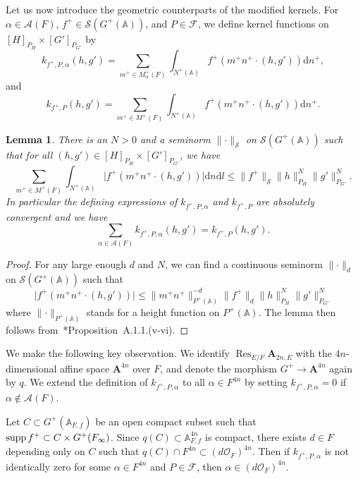 \documentclass[letterpaper,11pt]{amsart}
\newcommand{\bA}{\mathbb{A}}
\newcommand{\cA}{\mathcal{A}}
\newcommand{\cF}{\mathcal{F}}
\newcommand{\cO}{\mathcal{O}}
\newcommand{\cS}{\mathcal{S}}
\newcommand{\rd}{\mathrm{d}}
\newcommand{\<}{\negthickspace}
\providecommand{\abs}[1]{\lvert#1\rvert}
\providecommand{\aabs}[1]{\lVert#1\rVert}
\DeclareMathOperator{\Res}{Res}
\theoremstyle{definition}
\theoremstyle{plain}
\newtheorem{lemma}[definition]{Lemma}
\theoremstyle{remark}
\numberwithin{equation}{section}
\begin{document}
Let us now introduce the geometric counterparts of the modified kernels. For
$\alpha \in \cA(F)$, $f^+ \in \cS(G^+(\bA))$, and $P \in \cF$,
we define kernel functions on $[H]_{P_H} \times [G']_{P_{G'}}$ by
    \[
    k_{f^+, P, \alpha}(h,g')=
    \sum_{m^+ \in M^+_{\alpha}(F)}
    \int_{N^+(\bA)}
    f^+(m^+ n^+ \cdot (h,g'))
    \rd n^+,
    \]
and
    \[
    k_{f^+,P}(h, g')=
    \sum_{m^+ \in M^+(F)}
    \int_{N^+(\bA)}
    f^+( m^+ n^+ \cdot (h,g'))
    \rd n^+.
    \]

\begin{lemma}   \label{lemma:convergence_geometric_kernel_definition}
There is an $N>0$ and a seminorm $\aabs{\cdot}_{\cS}$ on $\cS(G^+(\bA))$
such that for all $(h, g') \in [H]_{P_H} \times [G']_{P_{G'}}$, we have
    \[
    \sum_{m^+ \in M^{+}(F)}
    \int_{N^+(\bA)}
    \abs{f^+(m^+n^+ \cdot(h,g'))}
    \rd n \rd l
    \leq \aabs{f^+}_{\cS} \aabs{h}_{P_H}^N \aabs{g'}_{P_{G'}}^N.
    \]
In particular the defining expressions of $k_{f^+, P,\alpha}$ and $k_{f^+,
P}$ are absolutely convergent and we have
    \[
    \sum_{\alpha \in \cA(F)} k_{f^+,P, \alpha}(h,g') = k_{f^+,P}(h,g').
    \]
\end{lemma}

\begin{proof}
For any large enough
$d$ and $N$, we can find a continuous seminorm $\aabs{\cdot}_{d}$ on
$\cS(G^+(\bA))$ such that
    \[
    \abs{f^+(m^+n^+ \cdot(h,g'))}
    \leq \aabs{m^+n^+}_{P^+(\bA)}^{-d} \aabs{f^+}_d
    \aabs{h}_{P_H}^N \aabs{g'}_{P_{G'}}^N
    \]
where $\aabs{\cdot}_{P^+(\bA)}$ stands for a height function on
$P^+(\bA)$. The lemma then follows
from~\cite{BP}*{Proposition~A.1.1.(v-vi)}.
\end{proof}

We make the following key observation. We identify $\Res_{E/F} \mathbf{A}_{2n, E}$ with the $4n$-dimensional affine space $\mathbf{A}^{4n}$ over $F$, and denote the morphism $G^+ \to \mathbf{A}^{4n}$ again by $q$. We extend the definition of $k_{f^+, P, \alpha}$ to all $\alpha \in F^{4n}$ by setting $k_{f^+, P, \alpha} = 0$ if $\alpha \not\in \cA(F)$.

Let $C \subset G^+(\bA_{F,
f})$ be an open compact subset such that $\operatorname{supp} f^+ \subset C \times
G^+(F_\infty)$. Since $q(C) \subset \bA_{F, f}^{4n}$ is compact, there exists
$d \in F$ depending only on $C$ such that $q(C) \cap F^{4n} \subset (d \cO_F)^{4n}
$. Then if $k_{f^+, P, \alpha}$ is not identically zero for some $\alpha \in
F^{4n}$ and $P \in \cF$, then $\alpha \in (d\cO_F)^{4n}$.
\end{document}
